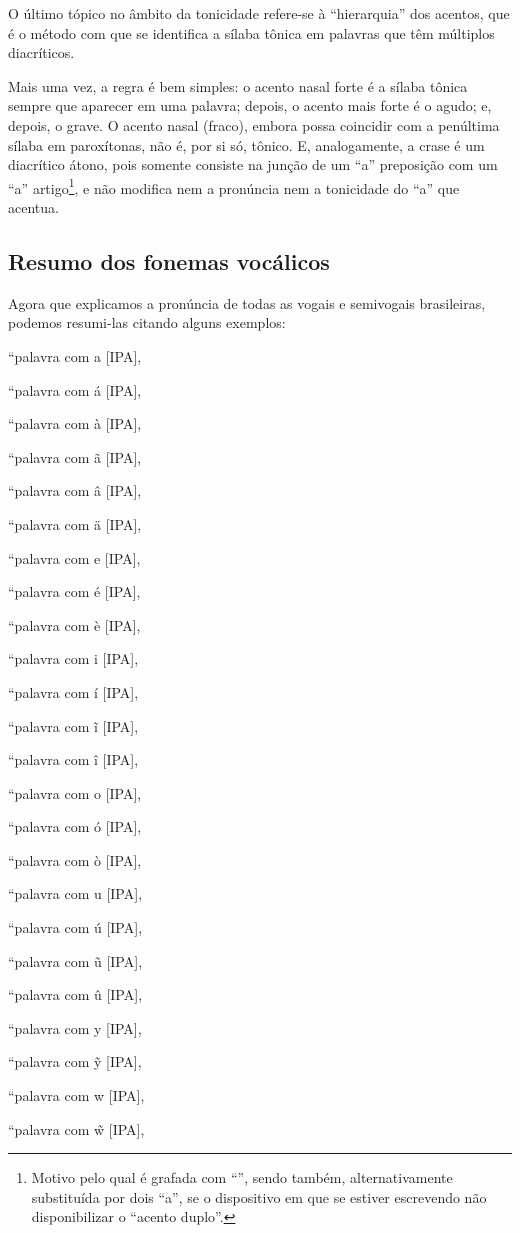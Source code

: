 \documentclass[12pt, a5paper, titlepage]{article}
\begin{document}
\begin{bilingualpages}
    O último tópico no âmbito da tonicidade refere-se à ``hierarquia'' dos acentos, que é o método com que se identifica a sílaba tônica em palavras que têm múltiplos diacríticos.
    
    Mais uma vez, a regra é bem simples: o acento nasal forte é a sílaba tônica sempre que aparecer em uma palavra; depois, o acento mais forte é o agudo; e, depois, o grave. O acento nasal (fraco), embora possa coincidir com a penúltima sílaba em paroxítonas, não é, por si só, tônico. E, analogamente, a crase é um diacrítico átono, pois somente consiste na junção de um ``a'' preposição com um ``a'' artigo\footnote{Motivo pelo qual é grafada com ``\textasciidieresis'', sendo também, alternativamente substituída por dois ``a'', se o dispositivo em que se estiver escrevendo não disponibilizar o ``acento duplo''.}, e não modifica nem a pronúncia nem a tonicidade do ``a'' que acentua.
    
    \subsection{Resumo dos fonemas vocálicos}
    Agora que explicamos a pronúncia de todas as vogais e semivogais brasileiras, podemos resumi-las citando alguns exemplos:
    \newline
    \par [não precisa de 1 exemplo por fonema vocálico]
    \par ``palavra com a [IPA],
    \par ``palavra com á [IPA],
    \par ``palavra com à [IPA],
    \par ``palavra com ã [IPA],
    \par ``palavra com â [IPA],
    \par ``palavra com ä [IPA],
    \par ``palavra com e [IPA],
    \par ``palavra com é [IPA],
    \par ``palavra com è [IPA],
    \par ``palavra com i [IPA],
    \par ``palavra com í [IPA],
    \par ``palavra com ĩ [IPA],
    \par ``palavra com î [IPA],
    \par ``palavra com o [IPA],
    \par ``palavra com ó [IPA],
    \par ``palavra com ò [IPA],
    \par ``palavra com u [IPA],
    \par ``palavra com ú [IPA],
    \par ``palavra com ũ [IPA],
    \par ``palavra com û [IPA],
    \par ``palavra com y [IPA],
    \par ``palavra com \~y [IPA],
    \par ``palavra com w [IPA],
    \par ``palavra com \~w [IPA],
    \newline


\end{bilingualpages}
\end{document}
